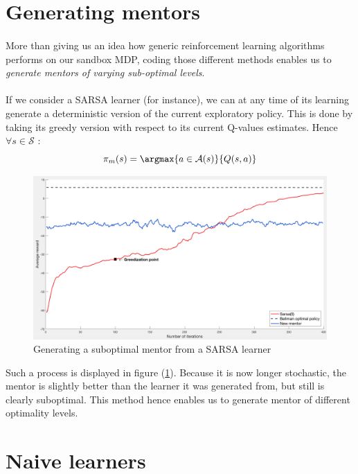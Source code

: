 \documentclass[a4paper]{report}
\begin{document}
{	\section{Generating mentors}
	{
		\paragraph{} More than giving us an idea how generic reinforcement learning algorithms performs on our sandbox MDP, coding those different methods enables us to \emph{generate mentors of varying sub-optimal levels}. 
		
		\paragraph{} If we consider a SARSA learner (for instance), we can at any time of its learning generate a deterministic version of the current exploratory policy. This is done by taking its greedy version with respect to its current Q-values estimates. Hence $\forall s\in\mathcal{S}$ : 
		\begin{equation}
			\pi_m(s) = \argmax{a\in\mathcal{A}(s)}{Q(s,a)}
		\end{equation}
		
		\begin{figure}[h!]
			\begin{center}
				\includegraphics[width=0.7\linewidth]{mentor_gen}
				\caption{Generating a suboptimal mentor from a SARSA learner}
				\label{fig::mentor_gen}
			\end{center}
		\end{figure}
		Such a process is displayed in figure (\ref{fig::mentor_gen}). Because it is now longer stochastic, the mentor is slightly better than the learner it was generated from, but still is clearly suboptimal. This method hence enables us to generate mentor of different optimality levels. 
	}
	\section{Naive learners}
	{
		\label{section::naive_learners}
}}
\end{document}
